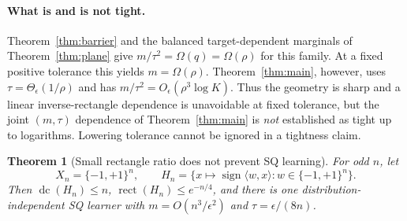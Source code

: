 \documentclass[11pt]{article}
\newtheorem{theorem}{Theorem}
\DeclareMathOperator{\dc}{dc}
\DeclareMathOperator{\sign}{sign}
\DeclareMathOperator{\rect}{rect}
\newcommand{\1}{\mathbf 1}
\begin{document}
\paragraph{What is and is not tight.}
Theorem~\ref{thm:barrier} and the balanced target-dependent marginals of Theorem~\ref{thm:plane} give $m/\tau^2=\Omega(q)=\Omega(\rho)$ for this family. At a fixed positive tolerance this yields $m=\Omega(\rho)$. Theorem~\ref{thm:main}, however, uses $\tau=\Theta_\epsilon(1/\rho)$ and has $m/\tau^2=O_\epsilon(\rho^3\log K)$. Thus the geometry is sharp and a linear inverse-rectangle dependence is unavoidable at fixed tolerance, but the joint $(m,\tau)$ dependence of Theorem~\ref{thm:main} is \emph{not} established as tight up to logarithms. Lowering tolerance cannot be ignored in a tightness claim.

\begin{samepage}
\begin{theorem}[Small rectangle ratio does not prevent SQ learning]\label{thm:halfspaces}
For odd $n$, let
\[
 X_n=\{-1,+1\}^n,\qquad
 H_n=\{x\mapsto\sign\langle w,x\rangle:w\in\{-1,+1\}^n\}.
\]
Then $\dc(H_n)\le n$, $\rect(H_n)\le e^{-n/4}$, and there is one distribution-independent SQ learner with $m=O(n^3/\epsilon^2)$ and $\tau=\epsilon/(8n)$.
\end{theorem}
\end{samepage}
\end{document}

